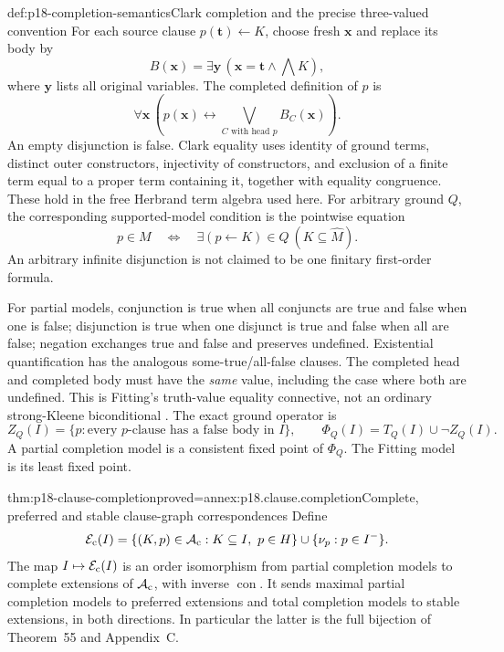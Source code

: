 \begin{hbdefinition}{def:p18-completion-semantics}{Clark completion and the precise three-valued convention}
For each source clause \(p(\mathbf t)\leftarrow K\),
choose fresh \(\mathbf x\) and replace its body by
\[
        B(\mathbf x)=\exists\mathbf y\,
                 (\mathbf x=\mathbf t\land\bigwedge K),
\]
where \(\mathbf y\) lists all original variables.
The completed definition of \(p\) is
\[
         \forall\mathbf x\,
            \left(p(\mathbf x)\leftrightarrow\bigvee_{C\text{ with head }p}
                                                  B_C(\mathbf x)\right).
\]
An empty disjunction is false. Clark equality uses
identity of ground terms, distinct outer constructors,
injectivity of constructors, and exclusion of a
finite term equal to a proper term containing it,
together with equality congruence. These hold in
the free Herbrand term algebra used here.
For arbitrary ground \(Q\), the corresponding
supported-model condition is the pointwise equation
\[
             p\in M\quad\Longleftrightarrow\quad
                    \exists(p\leftarrow K)\in Q\ (K\subseteq\widehat M).
\]
An arbitrary infinite disjunction is not claimed
to be one finitary first-order formula.

For partial models, conjunction is true when all
conjuncts are true and false when one is false;
disjunction is true when one disjunct is true
and false when all are false; negation exchanges
true and false and preserves undefined.
Existential quantification has the analogous
some-true/all-false clauses. The completed head
and completed body must have the \emph{same}
value, including the case where both are undefined.
This is Fitting's truth-value equality connective,
not an ordinary strong-Kleene biconditional
\cite[sec.~5, pp.~299--301]{Fitting1985KripkeKleene}.
The exact ground operator is
\[
 Z_Q(I)=\{p:\text{every }p\text{-clause has a false body in }I\},
             \qquad\Phi_Q(I)=T_Q(I)\cup\neg Z_Q(I).
\]
A partial completion model is a consistent fixed
point of \(\Phi_Q\). The Fitting model is its
least fixed point.
\end{hbdefinition}

\begin{hbtheorem}{thm:p18-clause-completion}{proved=annex:p18.clause.completion}{Complete, preferred and stable clause-graph correspondences}
Define
\[
 {\cal E}_{\rm c}(I)=
 \{(K,p)\in\mathcal A_{\rm c}:K\subseteq I,\ p\in H\}
                          \cup\{\nu_p:p\in I^-\}.
\]
The map \(I\mapsto{\cal E}_{\rm c}(I)\) is an
order isomorphism from partial completion models
to complete extensions of \(\mathcal A_{\rm c}\),
with inverse \(\operatorname{con}\).
It sends maximal partial completion models to
preferred extensions and total completion models
to stable extensions, in both directions.
In particular the latter is the full bijection
of Theorem~55 and Appendix~C.
\end{hbtheorem}

